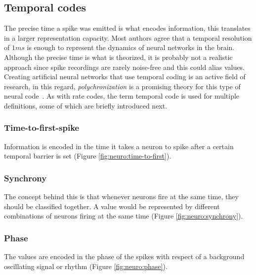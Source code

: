 \subsection{Temporal codes}
The precise time a spike was emitted is what encodes information, this translates in a larger representation capacity. Most authors agree that a temporal resolution of $1ms$ is enough to represent the dynamics of neural networks in the brain. Although the precise time is what is theorized, it is probably not a realistic approach since spike recordings are rarely noise-free and this could alias values. Creating artificial neural networks that use temporal coding is an active field of research, in this regard, \emph{polychronization} is a promising theory for this type of neural code~\cite{polychronization-Izhikevich2005}. As with rate codes, the term temporal code is used for multiple definitions, some of which are briefly introduced next.

\subsubsection{Time-to-first-spike}
Information is encoded in the time it takes a neuron to spike after a certain temporal barrier is set (Figure \ref{fig:neuro:time-to-first}).

\subsubsection{Synchrony}
The concept behind this is that whenever neurons fire at the same time, they should be classified together. A value would be represented by different combinations of neurons firing at the same time (Figure \ref{fig:neuro:synchrony}).

\subsubsection{Phase}
The values are encoded in the phase of the spikes with respect of a background oscillating signal or rhythm (Figure \ref{fig:neuro:phase}).

